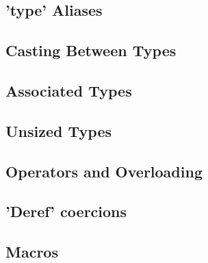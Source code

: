 \subsection{'type' Aliases}
\label{sec:syntax_typeAliases}


\subsection{Casting Between Types}
\label{sec:syntax_casting}


\subsection{Associated Types}
\label{sec:syntax_associatedTypes}


\subsection{Unsized Types}
\label{sec:syntax_unsizedTypes}


\subsection{Operators and Overloading}
\label{sec:syntax_operatorsAndOverloading}


\subsection{'Deref' coercions}
\label{sec:syntax_derefCoercions}


\subsection{Macros}
\label{sec:syntax_macros}

